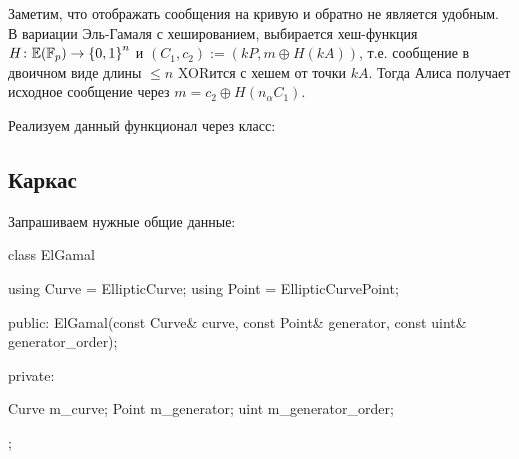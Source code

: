   Заметим, что отображать сообщения на кривую и обратно не является удобным. В вариации Эль-Гамаля с хешированием, выбирается хеш-функция $H\colon \mathbb E(\mathbb F_p)\to \left\{0,1\right\}^n$ и $(C_1,c_2) := (kP, m \oplus H(kA))$, т.е. сообщение в двоичном виде длины $\leqslant n$ XORится с хешем от точки $kA$. Тогда Алиса получает исходное сообщение через $m = c_2 \oplus H(n_\alpha C_1)$.

Реализуем данный функционал через класс:
\subsection{Каркас}
Запрашиваем нужные общие данные:
\begin{cppcode}
class ElGamal {
    using Curve = EllipticCurve;
    using Point = EllipticCurvePoint;

public:
    ElGamal(const Curve& curve, const Point& generator, const uint& generator_order);

private:

    Curve m_curve;
    Point m_generator;
    uint m_generator_order;
};
\end{cppcode}
